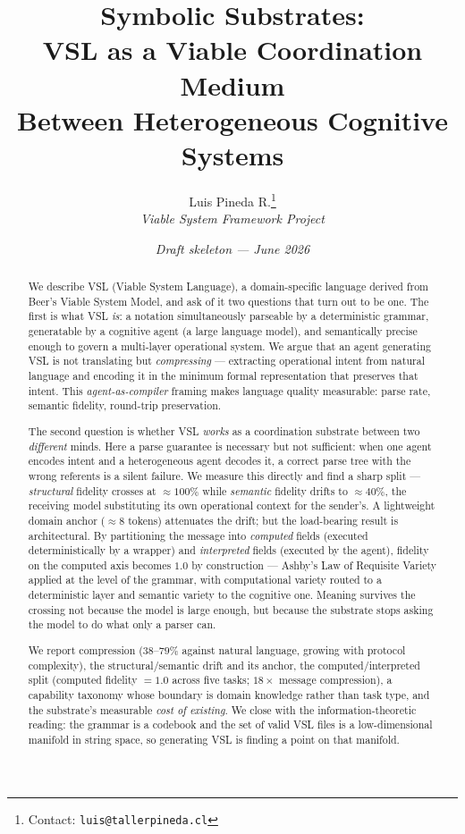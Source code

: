 \documentclass[12pt]{article}
\title{Symbolic Substrates:\\
  \large VSL as a Viable Coordination Medium\\
  Between Heterogeneous Cognitive Systems}
\author{Luis Pineda R.\thanks{Contact: \texttt{luis@tallerpineda.cl}} \\
  \small\textit{Viable System Framework Project}}
\date{\textit{Draft skeleton --- June 2026}}
\begin{document}
\maketitle

\begin{abstract}
We describe VSL (Viable System Language), a domain-specific language derived from
Beer's Viable System Model, and ask of it two questions that turn out to be one. The
first is what VSL \emph{is}: a notation simultaneously parseable by a deterministic
grammar, generatable by a cognitive agent (a large language model), and semantically
precise enough to govern a multi-layer operational system. We argue that an agent
generating VSL is not translating but \emph{compressing} --- extracting operational
intent from natural language and encoding it in the minimum formal representation that
preserves that intent. This \emph{agent-as-compiler} framing makes language quality
measurable: parse rate, semantic fidelity, round-trip preservation.

The second question is whether VSL \emph{works} as a coordination substrate between two
\emph{different} minds. Here a parse guarantee is necessary but not sufficient: when one
agent encodes intent and a heterogeneous agent decodes it, a correct parse tree with the
wrong referents is a silent failure. We measure this directly and find a sharp split ---
\emph{structural} fidelity crosses at $\approx 100\%$ while \emph{semantic} fidelity
drifts to $\approx 40\%$, the receiving model substituting its own operational context
for the sender's. A lightweight domain anchor ($\approx 8$ tokens) attenuates the drift;
but the load-bearing result is architectural. By partitioning the message into
\emph{computed} fields (executed deterministically by a wrapper) and \emph{interpreted}
fields (executed by the agent), fidelity on the computed axis becomes $1.0$ by
construction --- Ashby's Law of Requisite Variety applied at the level of the grammar,
with computational variety routed to a deterministic layer and semantic variety to the
cognitive one. Meaning survives the crossing not because the model is large enough, but
because the substrate stops asking the model to do what only a parser can.

We report compression ($38$--$79\%$ against natural language, growing with protocol
complexity), the structural/semantic drift and its anchor, the computed/interpreted
split (computed fidelity $=1.0$ across five tasks; $18\times$ message compression), a
capability taxonomy whose boundary is domain knowledge rather than task type, and the
substrate's measurable \emph{cost of existing}. We close with the information-theoretic
reading: the grammar is a codebook and the set of valid VSL files is a low-dimensional
manifold in string space, so generating VSL is finding a point on that manifold.
\end{abstract}
\end{document}
